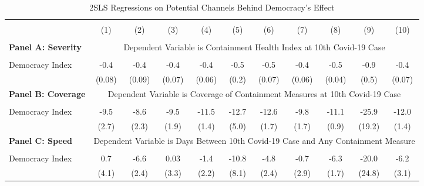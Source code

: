\begin{table}[!htbp] \centering 
  \caption{2SLS Regressions on Potential Channels Behind Democracy's Effect} 
  \label{tab:channels} 
  \small
  \begin{threeparttable}
\begin{tabular}{@{\extracolsep{0pt}}lcccccccccc} 
\\[-1.8ex]\hline 
\hline \\[-1.8ex] 
 & (1) & (2) & (3) & (4) & (5) & (6) & (7) & (8) & (9) & (10)\\ 
\hline \\[-1.8ex] 
\textbf{ Panel A: Severity} & \multicolumn{10}{c}{ Dependent Variable is Containment Health Index at 10th Covid-19 Case} \\ 
\cline{2-11}  \\[-1.8ex]
Democracy Index     &        -0.4\sym{***}&        -0.4\sym{***}&        -0.4\sym{***}&        -0.4\sym{***}&        -0.5\sym{**} &        -0.5\sym{***}&        -0.4\sym{***}&        -0.5\sym{***}&        -0.9         &        -0.4\sym{***}\\
                    &      (0.08)         &      (0.09)         &      (0.07)         &      (0.06)         &       (0.2)         &      (0.07)         &      (0.06)         &      (0.04)         &       (0.5)         &      (0.07)         \\

 \textbf{ Panel B: Coverage} & \multicolumn{10}{c}{ Dependent Variable is Coverage of Containment Measures at 10th Covid-19 Case} \\ 
\cline{2-11}  \\[-1.8ex]
  Democracy Index     &        -9.5\sym{***}&        -8.6\sym{***}&        -9.5\sym{***}&       -11.5\sym{***}&       -12.7\sym{*}  &       -12.6\sym{***}&        -9.8\sym{***}&       -11.1\sym{***}&       -25.9         &       -12.0\sym{***}\\
                    &       (2.7)         &       (2.3)         &       (1.9)         &       (1.4)         &       (5.0)         &       (1.7)         &       (1.7)         &       (0.9)         &      (19.2)         &       (1.4)         \\

 \textbf { Panel C: Speed}  & \multicolumn{10}{c}{Dependent Variable is Days Between 10th Covid-19 Case and Any Containment Measure} \\ 
\cline{2-11}  \\[-1.8ex]
Democracy Index     &         0.7         &        -6.6\sym{**} &        0.03         &        -1.4         &       -10.8         &        -4.8\sym{*}  &        -0.7         &        -6.3\sym{***}&       -20.0         &        -6.2\sym{*}  \\
                    &       (4.1)         &       (2.4)         &       (3.3)         &       (2.2)         &       (8.1)         &       (2.4)         &       (2.9)         &       (1.7)         &      (24.8)         &       (3.1)         \\



\end{tabular}
\end{threeparttable}
\end{table}
